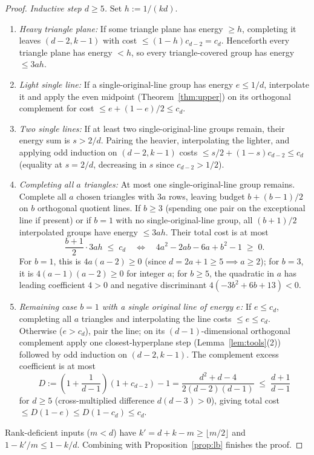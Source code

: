 \documentclass[11pt]{article}
\theoremstyle{plain}
\theoremstyle{definition}
\theoremstyle{remark}
\begin{document}
\begin{proof}
\emph{Inductive step $d \ge 5$.} Set $h := 1/(kd)$.
\begin{enumerate}[label=\textup{(\roman*)},leftmargin=1.8em]
\item \emph{Heavy triangle plane:} If some triangle plane has energy $\ge h$, completing it leaves $(d - 2, k - 1)$ with cost $\le (1 - h)c_{d-2} = c_d$. Henceforth every triangle plane has energy $< h$, so every triangle-covered group has energy $\le 3ah$.
\item \emph{Light single line:} If a single-original-line group has energy $e \le 1/d$, interpolate it and apply the even midpoint (Theorem~\ref{thm:upper}) on its orthogonal complement for cost $\le e + (1 - e)/2 \le c_d$.
\item \emph{Two single lines:} If at least two single-original-line groups remain, their energy sum is $s > 2/d$. Pairing the heavier, interpolating the lighter, and applying odd induction on $(d - 2, k - 1)$ costs $\le s/2 + (1 - s)c_{d-2} \le c_d$ (equality at $s = 2/d$, decreasing in $s$ since $c_{d-2} > 1/2$).
\item \emph{Completing all $a$ triangles:} At most one single-original-line group remains. Complete all $a$ chosen triangles with $3a$ rows, leaving budget $b + (b - 1)/2$ on $b$ orthogonal quotient lines. If $b \ge 3$ (spending one pair on the exceptional line if present) or if $b = 1$ with no single-original-line group, all $(b + 1)/2$ interpolated groups have energy $\le 3ah$. Their total cost is at most
\[
\frac{b + 1}{2}\cdot 3ah \;\le\; c_d
\quad\Longleftrightarrow\quad
4a^2 - 2ab - 6a + b^2 - 1 \;\ge\; 0.
\]
For $b = 1$, this is $4a(a - 2) \ge 0$ (since $d = 2a + 1 \ge 5 \implies a \ge 2$); for $b = 3$, it is $4(a - 1)(a - 2) \ge 0$ for integer $a$; for $b \ge 5$, the quadratic in $a$ has leading coefficient $4 > 0$ and negative discriminant $4(-3b^2 + 6b + 13) < 0$.
\item \emph{Remaining case $b = 1$ with a single original line of energy $e$:} If $e \le c_d$, completing all $a$ triangles and interpolating the line costs $\le e \le c_d$. Otherwise ($e > c_d$), pair the line; on its $(d - 1)$-dimensional orthogonal complement apply one closest-hyperplane step (Lemma~\ref{lem:tools}(2)) followed by odd induction on $(d - 2, k - 1)$. The complement excess coefficient is at most
\[
D := \left(1 + \frac{1}{d - 1}\right)(1 + c_{d-2}) - 1 = \frac{d^2 + d - 4}{2(d - 2)(d - 1)} \;\le\; \frac{d + 1}{d - 1}
\]
for $d \ge 5$ (cross-multiplied difference $d(d - 3) > 0$), giving total cost $\le D(1 - e) \le D(1 - c_d) \le c_d$.
\end{enumerate}
Rank-deficient inputs ($m < d$) have $k' = d + k - m \ge \lfloor m/2 \rfloor$ and $1 - k'/m \le 1 - k/d$.
Combining with Proposition~\ref{prop:lb} finishes the proof.
\end{proof}
\end{document}
